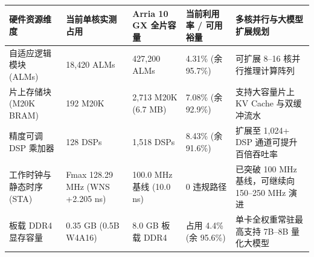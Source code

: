 \documentclass[11pt,a4paper]{article}
\begin{document}
{\footnotesize\renewcommand{\arraystretch}{1.14}\begin{longtable}{@{}L{0.19\textwidth}L{0.16\textwidth}L{0.16\textwidth}L{0.15\textwidth}L{0.24\textwidth}@{}}\toprule

\textbf{硬件资源维度} & \textbf{当前单核实测占用} & \textbf{Arria 10 GX 全片容量} & \textbf{当前利用率 /\allowbreak{} 可用裕量} & \textbf{多核并行与大模型扩展规划}\\\midrule\endhead

自适应逻辑模块 (\allowbreak{}ALMs)\allowbreak{} & 18,\allowbreak{}420 ALMs & 427,\allowbreak{}200 ALMs & 4.31\% (\allowbreak{}余 95.7\%)\allowbreak{} & 可扩展 8–16 核并行推理计算阵列\\[2pt]

片上存储块 (\allowbreak{}M20K BRAM)\allowbreak{} & 192 M20K & 2,\allowbreak{}713 M20K (\allowbreak{}6.7 MB)\allowbreak{} & 7.08\% (\allowbreak{}余 92.9\%)\allowbreak{} & 支持大容量片上 KV Cache 与双缓冲流水\\[2pt]

精度可调 DSP 乘加器 & 128 DSPs & 1,\allowbreak{}518 DSPs & 8.43\% (\allowbreak{}余 91.6\%)\allowbreak{} & 扩展至 1,\allowbreak{}024+\allowbreak{} DSP 通道可提升百倍吞吐率\\[2pt]

工作时钟与静态时序 (\allowbreak{}STA)\allowbreak{} & Fmax 128.29 MHz (\allowbreak{}WNS +\allowbreak{}2.205 ns)\allowbreak{} & 100.0 MHz 基线 (\allowbreak{}10.0 ns)\allowbreak{} & 0 违规路径 & 已突破 100 MHz 基线，可继续向 150–250 MHz 演进\\[2pt]

板载 DDR4 显存容量 & 0.35 GB (\allowbreak{}0.5B W4A16)\allowbreak{} & 8.0 GB 板载 DDR4 & 占用 4.4\% (\allowbreak{}余 95.6\%)\allowbreak{} & 单卡全权重常驻最高支持 7B–8B 量化大模型\\[2pt]

\bottomrule\end{longtable}}
\end{document}
